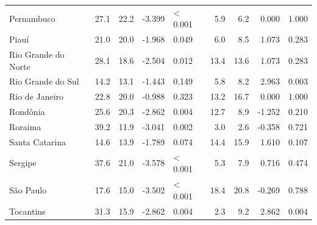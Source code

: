 \begin{table}[!t]
\begin{tabular*}{\linewidth}{@{\extracolsep{\fill}}lrrrlrrrr}
Pernambuco & 27.1 & 22.2 & -3.399 & < 0.001 & 5.9 & 6.2 & 0.000 & 1.000 \\ 
Piauí & 21.0 & 20.0 & -1.968 & 0.049 & 6.0 & 8.5 & 1.073 & 0.283 \\ 
Rio Grande do Norte & 28.1 & 18.6 & -2.504 & 0.012 & 13.4 & 13.6 & 1.073 & 0.283 \\ 
Rio Grande do Sul & 14.2 & 13.1 & -1.443 & 0.149 & 5.8 & 8.2 & 2.963 & 0.003 \\ 
Rio de Janeiro & 22.8 & 20.0 & -0.988 & 0.323 & 13.2 & 16.7 & 0.000 & 1.000 \\ 
Rondônia & 25.6 & 20.3 & -2.862 & 0.004 & 12.7 & 8.9 & -1.252 & 0.210 \\ 
Roraima & 39.2 & 11.9 & -3.041 & 0.002 & 3.0 & 2.6 & -0.358 & 0.721 \\ 
Santa Catarina & 14.6 & 13.9 & -1.789 & 0.074 & 14.4 & 15.9 & 1.610 & 0.107 \\ 
Sergipe & 37.6 & 21.0 & -3.578 & < 0.001 & 5.3 & 7.9 & 0.716 & 0.474 \\ 
São Paulo & 17.6 & 15.0 & -3.502 & < 0.001 & 18.4 & 20.8 & -0.269 & 0.788 \\ 
Tocantins & 31.3 & 15.9 & -2.862 & 0.004 & 2.3 & 9.2 & 2.862 & 0.004 \\ 
\bottomrule
\end{tabular*}
\end{table}


